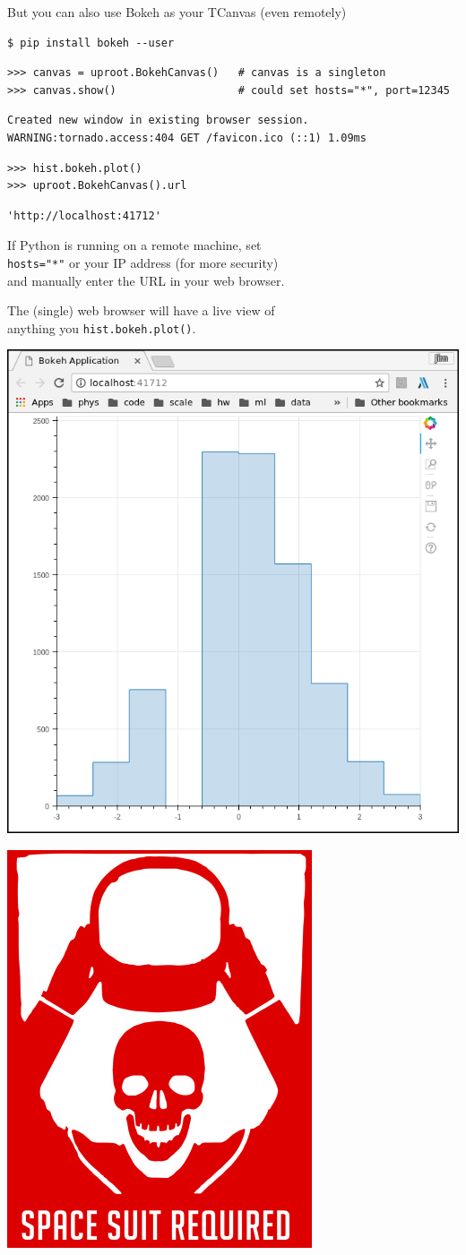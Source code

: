 \documentclass[aspectratio=169]{beamer}
\begin{document}
\begin{frame}[fragile]{But you can also use Bokeh as your TCanvas (even remotely)}
\vspace{0.25 cm}
\small
\begin{verbatim}
$ pip install bokeh --user
\end{verbatim}
\begin{verbatim}
>>> canvas = uproot.BokehCanvas()   # canvas is a singleton
>>> canvas.show()                   # could set hosts="*", port=12345
\end{verbatim}
\begin{verbatim}
Created new window in existing browser session.
WARNING:tornado.access:404 GET /favicon.ico (::1) 1.09ms
\end{verbatim}
\begin{verbatim}
>>> hist.bokeh.plot()
>>> uproot.BokehCanvas().url
\end{verbatim}
\begin{verbatim}
'http://localhost:41712'
\end{verbatim}

\vspace{0.2 cm}
If Python is running on a remote machine, set \\
{\tt hosts="*"} or your IP address (for more security) \\
and manually enter the URL in your web browser.

\vspace{0.2 cm}
The (single) web browser will have a live view of \\
anything you {\tt hist.bokeh.plot()}.

\vspace{-4.25 cm}
\hfill \includegraphics[height=4.5 cm]{bokeh_plot.png}\hspace{1 cm}

\vspace{-2.1 cm}
\hfill \includegraphics[width=1.5 cm]{danger.png}\hspace{-0.9 cm}
\vspace{3 cm}
\end{frame}
\end{document}
